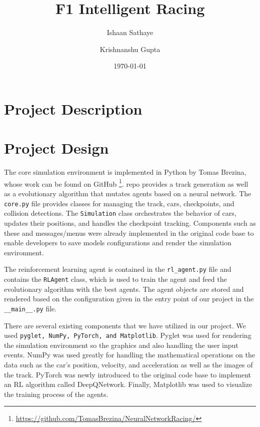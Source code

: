 \documentclass[12pt]{article}
\begin{document}
\title{F1 Intelligent Racing}

\author{%
   Ishaan Sathaye%
   \and%
   Krishnanshu Gupta%
}

\date{\today}

\maketitle



\section{Project Description}

\section{Project Design}

The core simulation environment is implemented in Python by Tomas Brezina, whose 
work can be found on GitHub
\footnote{\url{https://github.com/TomasBrezina/NeuralNetworkRacing/}}.
repo provides a track generation as well as a evolutionary algorithm that mutates 
agents based on a neural network. The \texttt{core.py} file provides classes for 
managing the track, cars, checkpoints, and collision detections. The 
\texttt{Simulation} class orchestrates the behavior of cars, updates their 
positions, and handles the checkpoint tracking. Components such as these and 
messages/menus were already implemented in the original code base to enable 
developers to save models configurations and render the simulation environment.

The reinforcement learning agent is contained in the \texttt{rl\_agent.py} file 
and contains the \texttt{RLAgent} class, which is used to train the agent and 
feed the evolutionary algorithm with the best agents. The agent objects are 
stored and rendered based on the configuration given in the entry point of our 
project in the \texttt{\_\_main\_\_.py} file.

There are several existing components that we have utilized in our project. We 
used \texttt{pyglet, NumPy, PyTorch, and Matplotlib}. Pyglet was used for 
rendering the simulation environment so the graphics and also handling the user 
input events. NumPy was used greatly for handling the mathematical operations 
on the data such as the car's position, velocity, and acceleration as well as 
the images of the track. PyTorch was newly introduced to the original code base 
to implement an RL algorithm called DeepQNetwork. Finally, Matplotlib was used 
to visualize the training process of the agents.
\end{document}
